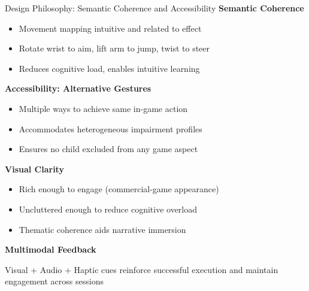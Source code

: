 \begin{frame}{Design Philosophy: Semantic Coherence and Accessibility}
	\textbf{\textcolor{gbAqua}{Semantic Coherence}}
	
	\begin{itemize}
		\item Movement mapping intuitive and related to effect
		\item Rotate wrist to aim, lift arm to jump, twist to steer
		\item Reduces cognitive load, enables intuitive learning
	\end{itemize}
	
	\vspace{0.2cm}
	
	\textbf{\textcolor{gbAqua}{Accessibility: Alternative Gestures}}
	
	\begin{itemize}
		\item Multiple ways to achieve same in-game action
		\item Accommodates heterogeneous impairment profiles
		\item Ensures no child excluded from any game aspect
	\end{itemize}
	
	\vspace{0.2cm}
	
	\textbf{\textcolor{gbAqua}{Visual Clarity}}
	
	\begin{itemize}
		\item Rich enough to engage (commercial-game appearance)
		\item Uncluttered enough to reduce cognitive overload
		\item Thematic coherence aids narrative immersion
	\end{itemize}
	
	\vspace{0.2cm}
	
	\textbf{\textcolor{gbAqua}{Multimodal Feedback}}
	
	Visual + Audio + Haptic cues reinforce successful execution and maintain engagement across sessions
\end{frame}

